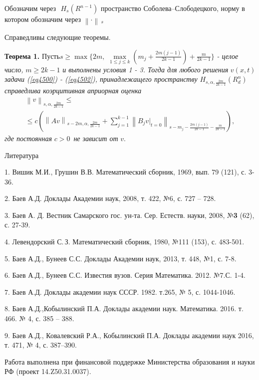 Обозначим через $\,\,H_s (R^{n - 1})$ пространство Со\-бо\-ле\-ва--Сло\-бо\-де\-ц\-ко\-го,
норму в котором обозначим через $\left\| \cdot \right\|\,_s \,$

Справедливы следующие теоремы.

\textbf{Теорема 1.} $Пусть s \ge \max \{2m,\,\,\mathop {\max }\limits_{1 \le j \le
k} (m_j + \frac{2m(j - 1)}{2k - 1}) + \frac{m}{2k - 1}\}$\textit{ - целое число, }$m \ge 2k - 1$\textit{ и выполнены условия 1 - 3. Тогда для любого решения }$v(x,t)$\textit{ задачи (\ref{eq4500}) - (\ref{eq4502}), принадлежащего пространству }$H_{s,\alpha
,\frac{2m}{2k - 1}} (R_d^n )\,$\textit{ справедлива коэрцитивная априорная оценка }
\begin{multline*}
\left\| v \right\|_{s,\alpha ,\frac{2m}{2k - 1}} \le
\\ \le
c(\left\| {Av}
\right\|_{s - 2m,\alpha ,\frac{2m}{2k - 1}} + \sum\limits_{j = 1}^{k - 1}
{\left\| {B_j \left. v \right|_{t = 0} } \right\|_{s - m_j - \frac{2m(j -
1)}{2k - 1} - \frac{m}{2k - 1}} } ),
\end{multline*}
\textit{где постоянная }$c > 0\,$\textit{ не зависит от }$v.$



\begin{center}
Литература
\end{center}

1. Вишик М.И., Грушин В.В. Математический сборник, 1969, вып. 79 (121), с.
3-36.

2. Баев А.Д. Доклады Академии наук, 2008, т. 422, №6, с. 727 -- 728.

3. Баев А. Д. Вестник Самарского гос. ун-та. Сер. Ес\-теств. науки, 2008,
№\textbf{3} (62), с. 27-39.

4. Левендорский С.\,З. Математический сборник, 1980, №111 (153), с. 483-501.

5. Баев А.Д., Бунеев С.С. Доклады Академии наук, 2013, т. 448, №1, с. 7-8.

6. Баев А.Д., Бунеев С.С. Известия вузов. Серия Математика. 2012. №7.С. 1-4.

7. Баев А.Д. Доклады академии наук СССР. 1982. т.265, № 5, с. 1044-1046.

8. Баев А.Д.,Кобылинский П.А. Доклады академии наук. Математика. 2016. т.
466. № 4, с. 385 -- 388.

9. Баев А.Д., Ковалевский Р.А., Кобылинский П.А. Доклады академии наук 2016,
т. 471, № 4, с. 387--390.





Работа выполнена при финансовой поддержке Ми\-ни\-с\-те\-р\-с\-т\-ва образования и науки
РФ (проект 14.Z50.31.0037).

